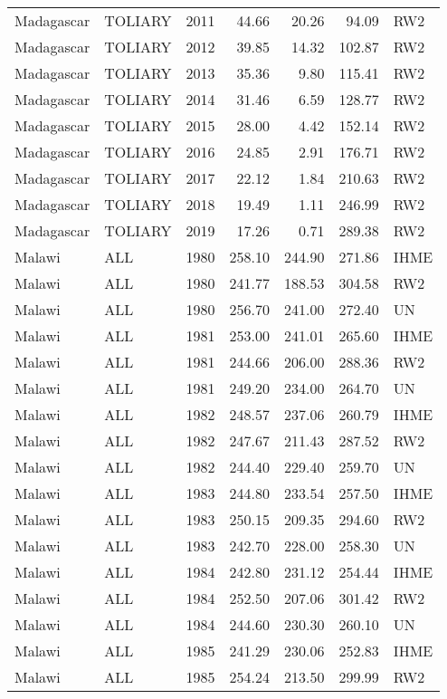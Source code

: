 \begin{longtable}{lllrrrl}
  Madagascar & TOLIARY & 2011 & 44.66 & 20.26 & 94.09 & RW2 \\ 
  Madagascar & TOLIARY & 2012 & 39.85 & 14.32 & 102.87 & RW2 \\ 
  Madagascar & TOLIARY & 2013 & 35.36 & 9.80 & 115.41 & RW2 \\ 
  Madagascar & TOLIARY & 2014 & 31.46 & 6.59 & 128.77 & RW2 \\ 
  Madagascar & TOLIARY & 2015 & 28.00 & 4.42 & 152.14 & RW2 \\ 
  Madagascar & TOLIARY & 2016 & 24.85 & 2.91 & 176.71 & RW2 \\ 
  Madagascar & TOLIARY & 2017 & 22.12 & 1.84 & 210.63 & RW2 \\ 
  Madagascar & TOLIARY & 2018 & 19.49 & 1.11 & 246.99 & RW2 \\ 
  Madagascar & TOLIARY & 2019 & 17.26 & 0.71 & 289.38 & RW2 \\ 
  Malawi & ALL & 1980 & 258.10 & 244.90 & 271.86 & IHME \\ 
  Malawi & ALL & 1980 & 241.77 & 188.53 & 304.58 & RW2 \\ 
  Malawi & ALL & 1980 & 256.70 & 241.00 & 272.40 & UN \\ 
  Malawi & ALL & 1981 & 253.00 & 241.01 & 265.60 & IHME \\ 
  Malawi & ALL & 1981 & 244.66 & 206.00 & 288.36 & RW2 \\ 
  Malawi & ALL & 1981 & 249.20 & 234.00 & 264.70 & UN \\ 
  Malawi & ALL & 1982 & 248.57 & 237.06 & 260.79 & IHME \\ 
  Malawi & ALL & 1982 & 247.67 & 211.43 & 287.52 & RW2 \\ 
  Malawi & ALL & 1982 & 244.40 & 229.40 & 259.70 & UN \\ 
  Malawi & ALL & 1983 & 244.80 & 233.54 & 257.50 & IHME \\ 
  Malawi & ALL & 1983 & 250.15 & 209.35 & 294.60 & RW2 \\ 
  Malawi & ALL & 1983 & 242.70 & 228.00 & 258.30 & UN \\ 
  Malawi & ALL & 1984 & 242.80 & 231.12 & 254.44 & IHME \\ 
  Malawi & ALL & 1984 & 252.50 & 207.06 & 301.42 & RW2 \\ 
  Malawi & ALL & 1984 & 244.60 & 230.30 & 260.10 & UN \\ 
  Malawi & ALL & 1985 & 241.29 & 230.06 & 252.83 & IHME \\ 
  Malawi & ALL & 1985 & 254.24 & 213.50 & 299.99 & RW2 \\ 

\end{longtable}
